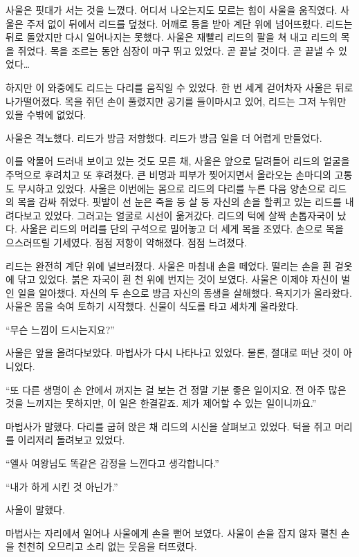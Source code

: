 사울은 핏대가 서는 것을 느꼈다. 어디서 나오는지도 모르는 힘이 사울을 움직였다. 사울은 주저 없이 뒤에서 리드를 덮쳤다. 어깨로 등을 받아 계단 위에 넘어뜨렸다. 리드는 뒤로 돌았지만 다시 일어나지는 못했다. 사울은 재빨리 리드의 팔을 쳐 내고 리드의 목을 쥐었다. 목을 조르는 동안 심장이 마구 뛰고 있었다. 곧 끝날 것이다. 곧 끝낼 수 있었다\ldots

하지만 이 와중에도 리드는 다리를 움직일 수 있었다. 한 번 세게 걷어차자 사울은 뒤로 나가떨어졌다. 목을 쥐던 손이 풀렸지만 공기를 들이마시고 있어, 리드는 그저 누워만 있을 수밖에 없었다.

사울은 격노했다. 리드가 방금 저항했다. 리드가 방금 일을 더 어렵게 만들었다.

이를 악물어 드러내 보이고 있는 것도 모른 채, 사울은 앞으로 달려들어 리드의 얼굴을 주먹으로 후려치고 또 후려쳤다. 큰 비명과 피부가 찢어지면서 올라오는 손마디의 고통도 무시하고 있었다. 사울은 이번에는 몸으로 리드의 다리를 누른 다음 양손으로 리드의 목을 감싸 쥐었다. 핏발이 선 눈은 죽을 둥 살 둥 자신의 손을 할퀴고 있는 리드를 내려다보고 있었다. 그러고는 얼굴로 시선이 옮겨갔다. 리드의 턱에 살짝 손톱자국이 났다. 사울은 리드의 머리를 단의 구석으로 밀어놓고 더 세게 목을 조였다. 손으로 목을 으스러뜨릴 기세였다. 점점 저항이 약해졌다. 점점 느려졌다.

리드는 완전히 계단 위에 널브러졌다. 사울은 마침내 손을 떼었다. 떨리는 손을 흰 겉옷에 닦고 있었다. 붉은 자국이 흰 천 위에 번지는 것이 보였다. 사울은 이제야 자신이 벌인 일을 알아챘다. 자신의 두 손으로 방금 자신의 동생을 살해했다. 욕지기가 올라왔다. 사울은 몸을 숙여 토하기 시작했다. 신물이 식도를 타고 세차게 올라왔다.

``무슨 느낌이 드시는지요?''

사울은 앞을 올려다보았다. 마법사가 다시 나타나고 있었다. 물론, 절대로 떠난 것이 아니었다.

``또 다른 생명이 손 안에서 꺼지는 걸 보는 건 정말 기분 좋은 일이지요. 전 아주 많은 것을 느끼지는 못하지만, 이 일은 한결같죠. 제가 제어할 수 있는 일이니까요.''

마법사가 말했다. 다리를 굽혀 앉은 채 리드의 시신을 살펴보고 있었다. 턱을 쥐고 머리를 이리저리 돌려보고 있었다.

``엘사 여왕님도 똑같은 감정을 느낀다고 생각합니다.''

``내가 하게 시킨 것 아닌가.''

사울이 말했다.

마법사는 자리에서 일어나 사울에게 손을 뻗어 보였다. 사울이 손을 잡지 않자 펼친 손을 천천히 오므리고 소리 없는 웃음을 터뜨렸다.

